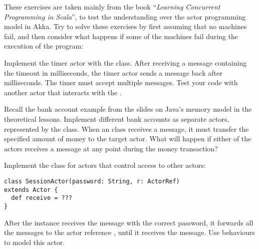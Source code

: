 \documentclass[11pt]{article}
\begin{document}
\myHeader

These exercises are taken mainly from the book ``\emph{Learning Concurrent Programming in Scala}'', to test the understanding over the actor programming model in Akka.
Try to solve these exercises by first assuming that no machines fail, and then consider what happens if some of the machines fail during the execution of the program:

\begin{myExercise}
Implement the timer actor with the  class. After receiving a  message containing the  timeout in milliseconds, the timer actor sends a  message back after  milliseconds. The timer must accept multiple  messages. Test your code with another actor  that interacts with the .
\end{myExercise}

\begin{myExercise}
Recall the bank account example from the slides on Java's memory model in the theoretical lessons. Implement different bank accounts as separate actors, represented by the  class. When an  class receives a  message, it must transfer the specified amount of money to the target actor. What will happen if either of the actors receives a  message at any point during the money transaction?
\end{myExercise}

\begin{myExercise}
Implement the  class for actors that control access to other actors:
\begin{lstlisting}
class SessionActor(password: String, r: ActorRef)
extends Actor {
  def receive = ???
}
\end{lstlisting}
After the  instance receives the  message with the correct password, it forwards all the messages to the actor reference , until it receives the  message. Use behaviours to model this actor.
\end{myExercise}
\end{document}
